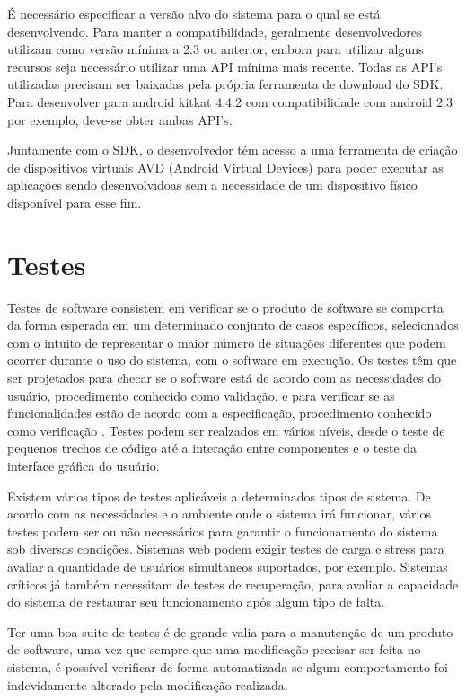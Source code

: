 É necessário especificar a versão alvo do sistema para o qual se está desenvolvendo. Para manter a compatibilidade, geralmente desenvolvedores utilizam como versão mínima a 2.3 ou anterior, embora para utilizar alguns recursos seja necessário utilizar uma API mínima mais recente. Todas as API's utilizadas precisam ser baixadas pela própria ferramenta de download do SDK. Para desenvolver para android kitkat 4.4.2 com compatibilidade com android 2.3 por exemplo, deve-se obter ambas API's.

Juntamente com o SDK, o desenvolvedor tém acesso a uma ferramenta de criação de dispositivos virtuais AVD (Android Virtual Devices) para poder executar as aplicações sendo desenvolvidoas sem a necessidade de um dispositivo físico disponível para esse fim.

\section{Testes}

Testes de software consistem em verificar se o produto de software se comporta da forma esperada em um determinado conjunto de casos específicos, selecionados com o intuito de representar o maior número de situações diferentes que podem ocorrer durante o uso do sistema, com o software em execução. Os testes têm que ser projetados para checar se o software está de acordo com as necessidades do usuário, procedimento conhecido como validação, e para verificar se as funcionalidades estão de acordo com a especificação, procedimento conhecido como verificação \cite{swebok}. Testes podem ser realzados em vários níveis, desde o teste de pequenos trechos de código até a interação entre componentes e o teste da interface gráfica do usuário.

Existem vários tipos de testes aplicáveis a determinados tipos de sistema. De acordo com as necessidades e o ambiente onde o sistema irá funcionar, vários testes podem ser ou não necessários para garantir o funcionamento do sistema sob diversas condições. Sistemas web podem exigir testes de carga e stress para avaliar a quantidade de usuários simultaneos suportados, por exemplo. Sistemas críticos já também necessitam de testes de recuperação, para avaliar a capacidade do sistema de restaurar seu funcionamento após algum tipo de falta.

Ter uma boa suite de testes é de grande valia para a manutenção de um produto de software, uma vez que sempre que uma modificação precisar ser feita no sistema, é possível verificar de forma automatizada se algum comportamento foi indevidamente alterado pela modificação realizada.

